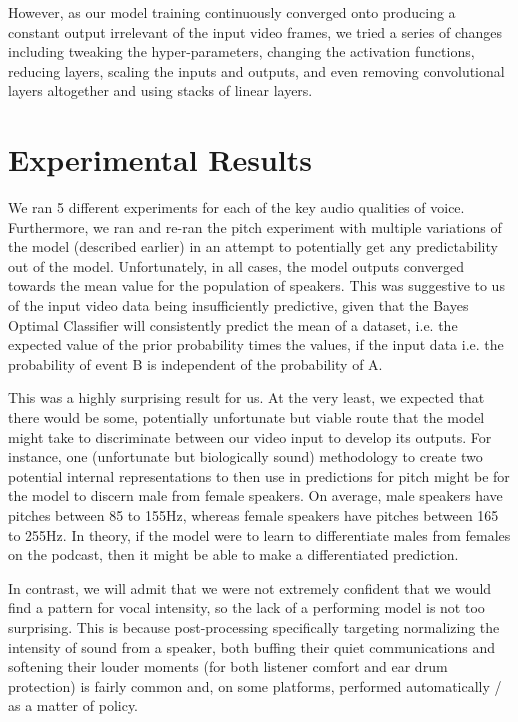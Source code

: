 \documentclass[10pt,twocolumn,letterpaper]{article}
\begin{document}
However, as our model training continuously converged onto producing a constant output irrelevant of the input video frames, we tried a series of changes including tweaking the hyper-parameters, changing the activation functions,  reducing layers, scaling the inputs and outputs, and even removing convolutional layers altogether and using stacks of linear layers. 

\section{Experimental Results}
\label{sec:results}

We ran 5 different experiments for each of the key audio qualities of voice. Furthermore, we ran and re-ran the pitch experiment with multiple variations of the model (described earlier) in an attempt to potentially get any predictability out of the model. Unfortunately, in all cases, the model outputs converged towards the mean value for the population of speakers. This was suggestive to us of the input video data being insufficiently predictive, given that the Bayes Optimal Classifier will consistently predict the mean of a dataset, i.e. the expected value of the prior probability times the values, if the input data i.e. the probability of event B is independent of the probability of A.

This was a highly surprising result for us. At the very least, we expected that there would be some, potentially unfortunate but viable route that the model might take to discriminate between our video input to develop its outputs. For instance, one (unfortunate but biologically sound) methodology to create two potential internal representations to then use in predictions for pitch might be for the model to discern male from female speakers. On average, male speakers have pitches between 85 to 155Hz, whereas female speakers have pitches between 165 to 255Hz\cite{Fitch1970}. In theory, if the model were to learn to differentiate males from females on the podcast, then it might be able to make a differentiated prediction.

In contrast, we will admit that we were not extremely confident that we would find a pattern for vocal intensity, so the lack of a performing model is not too surprising. This is because post-processing specifically targeting normalizing the intensity of sound from a speaker, both buffing their quiet communications and softening their louder moments (for both listener comfort and ear drum protection) is fairly common and, on some platforms, performed automatically / as a matter of policy. 
\end{document}
